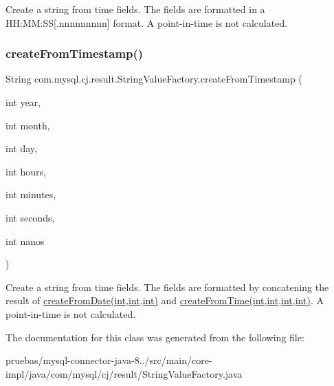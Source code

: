 Create a string from time fields. The fields are formatted in a H\+H\+:\+MM\+:SS\mbox{[}.nnnnnnnnn\mbox{]} format. A point-\/in-\/time is not calculated. \mbox{\label{classcom_1_1mysql_1_1cj_1_1result_1_1_string_value_factory_aff6a7f18d539842dd935facd7df39008}} 
\subsubsection{\texorpdfstring{create\+From\+Timestamp()}{createFromTimestamp()}}
{\footnotesize\ttfamily String com.\+mysql.\+cj.\+result.\+String\+Value\+Factory.\+create\+From\+Timestamp (\begin{DoxyParamCaption}\item[{int}]{year,  }\item[{int}]{month,  }\item[{int}]{day,  }\item[{int}]{hours,  }\item[{int}]{minutes,  }\item[{int}]{seconds,  }\item[{int}]{nanos }\end{DoxyParamCaption})}

Create a string from time fields. The fields are formatted by concatening the result of \mbox{\hyperlink{classcom_1_1mysql_1_1cj_1_1result_1_1_string_value_factory_a845e3704aa7f1a243b1fca5975dff12a}{create\+From\+Date(int,int,int)}} and \mbox{\hyperlink{classcom_1_1mysql_1_1cj_1_1result_1_1_string_value_factory_a403e61bfaa13268e2eb0a15ff92e0aea}{create\+From\+Time(int,int,int,int)}}. A point-\/in-\/time is not calculated. 

The documentation for this class was generated from the following file\+:\begin{DoxyCompactItemize}
\item 
pruebas/mysql-\/connector-\/java-\/8../src/main/core-\/impl/java/com/mysql/cj/result/String\+Value\+Factory.\+java\end{DoxyCompactItemize}
